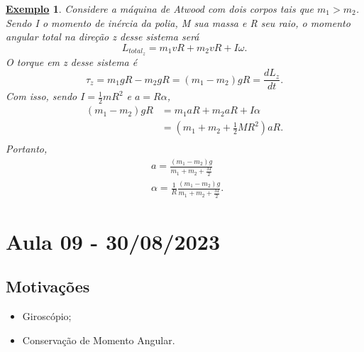 \documentclass{article}
\newtheorem{example}{\underline{Exemplo}}
\begin{document}
\begin{example}
  Considere a máquina de Atwood com dois corpos tais que \(m_{1} > m_{2}\). Sendo I o momento de inércia da polia, M sua massa e R seu raio, o momento angular total na direção z desse sistema será 
  \[
    L_{total_z} = m_{1}vR + m_{2}vR + I\omega.
  \]
  O torque em z desse sistema é 
  \[
    \tau_{z} = m_{1}gR - m_{2}gR = (m_{1}-m_{2})gR = \frac{dL_{z}}{dt}.
  \]
  Com isso, sendo \(I = \frac{1}{2}mR^{2}\) e \(a  = R\alpha \),
  \begin{align*}
    (m_{1}-m_{2})gR &= m_{1}aR + m_{2}aR + I\alpha \\
                    &= (m_{1}+m_{2}+\frac{1}{2}MR^{2})aR.\\
  \end{align*}
  Portanto, 
  \begin{align*}
    &a = \frac{(m_{1}-m_{2})g}{m_{1}+m_{2}+\frac{M}{2}}\\
    &\alpha = \frac{1}{R}\frac{(m_{1}-m_{2})g}{m_{1}+m_{2}+\frac{M}{2}}.\
  \end{align*}
\end{example}
\newpage

\section{Aula 09 - 30/08/2023}
\subsection{Motivações}
\begin{itemize}
  \item Giroscópio;
  \item Conservação de Momento Angular.
\end{itemize}
\end{document}

